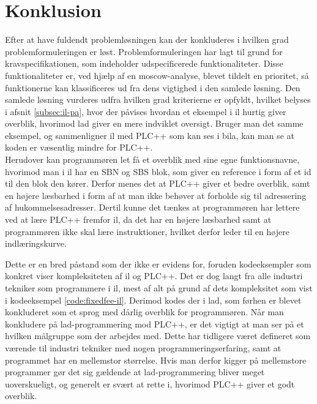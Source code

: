 \chapter{Konklusion}
\label{sec:konklusion}

Efter at have fuldendt problemløsningen kan der konkluderes i hvilken grad problemformuleringen er løst.
Problemformuleringen har lagt til grund for kravspecifikationen, som indeholder udspecificerede funktionaliteter.
Disse funktionaliteter er, ved hjælp af en \gls{moscow}-analyse, blevet tildelt en prioritet, så funktionerne kan klassificeres ud fra dens vigtighed i den samlede løsning.
Den samlede løsning vurderes udfra hvilken grad kriterierne er opfyldt, hvilket belyses i afsnit \ref{subsec:il-pa}, hvor der påvises hvordan et eksempel i \gls{il} hurtig giver overblik, hvorimod \gls{lad} giver en mere indviklet oversigt. Bruger man det samme eksempel, og sammenligner \gls{il} med PLC++ som kan ses i bila, kan man se at koden er væsentlig mindre for PLC++.\\

\noindent Herudover kan programmøren let få et overblik med sine egne funktionsnavne, hvorimod man i \gls{il} har en SBN og SBS blok, som giver en reference i form af et id til den blok den kører.
Derfor menes det at PLC++ giver et bedre overblik, samt en højere læsbarhed i form af at man ikke behøver at forholde sig til adressering af hukommelsesadresser.
Dertil kunne det tænkes at programmøren har lettere ved at lære PLC++ fremfor \gls{il}, da det har en højere  læsbarhed samt at programmøren ikke skal lære instruktioner, hvilket derfor leder til en højere indlæringskurve. 

Dette er en bred påstand som der ikke er evidens for, foruden kodeeksempler som konkret viser kompleksiteten af \gls{il} og PLC++.
Det er dog langt fra alle industri tekniker som programmere i \gls{il}, mest af alt på grund af dets kompleksitet som vist i kodeeksempel \ref{code:fixedfee-il}.
Derimod kodes der i \gls{lad}, som førhen er blevet konkluderet som et sprog med dårlig overblik for programmøren.
Når man konkludere på \gls{lad}-programmering mod PLC++, er det vigtigt at man ser på et hvilken målgruppe som der arbejdes med.
Dette har tidligere været defineret som værende til industri tekniker med nogen programmeringserfaring, samt at programmet har en mellemstor størrelse.
Hvis man derfor kigger på mellemstore programmer gør det sig gældende at \gls{lad}-programmering bliver meget uoverskueligt, og generelt er svært at rette i, hvorimod PLC++ giver et godt overblik.\\

